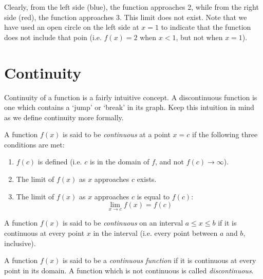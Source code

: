 \begin{eg}
Clearly, from the left side (blue), the function approaches 2, while from the right side (red), 
the function approaches 3. This limit does not exist. Note that we have used an open circle on the left side at $x=1$ to indicate that the function 
does not include that poin (i.e. $f(x) = 2$ when $x<1$, but not when $x=1$).
\end{eg}

\section{Continuity}

Continuity of a function is a fairly intuitive concept. A discontinuous function is
one which contains a `jump' or `break' in its graph. Keep this intuition in mind as 
we define continuity more formally.

\begin{definition}\label{def:continuity}
    A function $f(x)$ is said to be \textit{continuous} at a point $x = c$ if the following three conditions are met:
    \begin{enumerate}
        \item $f(c)$ is defined (i.e. $c$ is in the domain of $f$, and not $f(c) \rightarrow \infty$).
        \item The limit of $f(x)$ as $x$ approaches $c$ exists.
        \item The limit of $f(x)$ as $x$ approaches $c$ is equal to $f(c)$:
        \begin{equation*}
            \lim_{x \to c} f(x) = f(c)
        \end{equation*}
    \end{enumerate}
\end{definition}

\begin{definition}
    A function $f(x)$ is said to be \textit{continuous} on an interval $a \le x \le b$ if it is continuous at every point $x$ in the interval (i.e.
    every point between $a$ and $b$, inclusive).
\end{definition}

\begin{definition}
    A function $f(x)$ is said to be a \textit{continuous function} if it is continuous at every point in its domain.
    A function which is not continuous is called \textit{discontinuous}.
\end{definition}

